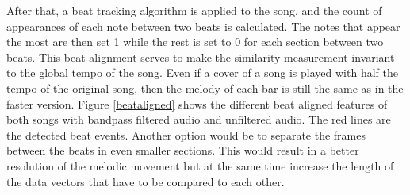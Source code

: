 \noindent After that, a beat tracking algorithm is applied to the song, and the count of appearances of each note between two beats is calculated. The notes that appear the most are then set 1 while the rest is set to 0 for each section between two beats. This beat-alignment serves to make the similarity measurement invariant to the global tempo of the song. Even if a cover of a song is played with half the tempo of the original song, then the melody of each bar is still the same as in the faster version.
Figure \ref{beataligned} shows the different beat aligned features of both songs with bandpass filtered audio and unfiltered audio. The red lines are the detected beat events.
Another option would be to separate the frames between the beats in even smaller sections. This would result in a better resolution of the melodic movement but at the same time increase the length of the data vectors that have to be compared to each other.
